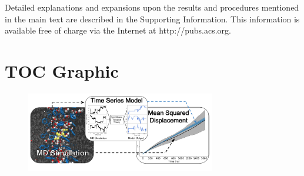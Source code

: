 \documentclass[journal=jctcce,manuscript=article]{achemso}
\begin{document}
  Detailed explanations and expansions upon the results and procedures
  mentioned in the main text are described in the Supporting Information. This
  information is available free of charge via the Internet at
  http://pubs.acs.org.

  

  \section*{TOC Graphic}
    
  \begin{figure}[!htb]
  \centering
  \includegraphics[width=3.25in]{toc.pdf}
  \end{figure}
\end{document}
